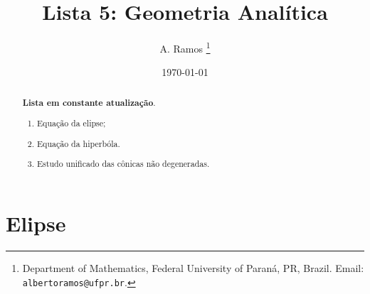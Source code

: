 \documentclass{article}
\begin{document}
\title{Lista 5: Geometria Analítica}

\author{
A. Ramos \thanks{Department of Mathematics,
    Federal University of Paraná, PR, Brazil.
    Email: {\tt albertoramos@ufpr.br}.}
}

\date{\today}
 
\maketitle

\begin{abstract}
{\bf Lista em constante atualização}.
 \begin{enumerate}
 \item Equação da elipse; 
 \item Equação da hiperbóla.
 \item Estudo unificado das cônicas não degeneradas.
 \end{enumerate}
\end{abstract}

\section*{Elipse} 
 
\end{document}
